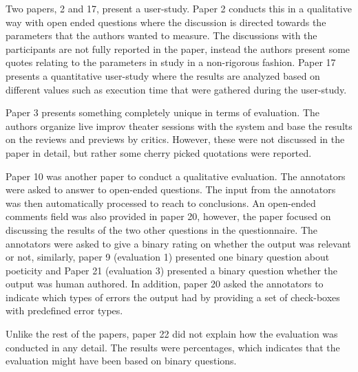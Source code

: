 \documentclass[11pt,a4paper]{article}
\begin{document}
Two papers, 2 and 17, present a user-study. Paper 2 conducts this in a qualitative way with open ended questions where the discussion is directed towards the parameters that the authors wanted to measure. The discussions with the participants are not fully reported in the paper, instead the authors present some quotes relating to the parameters in study in a non-rigorous fashion. Paper 17 presents a quantitative user-study where the results are analyzed based on different values such as execution time that were gathered during the user-study.

Paper 3 presents something completely unique in terms of evaluation. The authors organize live improv theater sessions with the system and base the results on the reviews and previews by critics. However, these were not discussed in the paper in detail, but rather some cherry picked quotations were reported.

Paper 10 was another paper to conduct a qualitative evaluation. The annotators were asked to answer to open-ended questions. The input from the annotators was then automatically processed to reach to conclusions. An open-ended comments field was also provided in paper 20, however, the paper focused on discussing the results of the two other questions in the questionnaire. The annotators were asked to give a binary rating on whether the output was relevant or not, similarly, paper 9 (evaluation 1) presented one binary question about poeticity and Paper 21 (evaluation 3) presented a binary question whether the output was human authored. In addition, paper 20 asked the annotators to indicate which types of errors the output had by providing a set of check-boxes with predefined error types.

Unlike the rest of the papers, paper 22 did not explain how the evaluation was conducted in any detail. The results were percentages, which indicates that the evaluation might have been based on binary questions.
\end{document}
